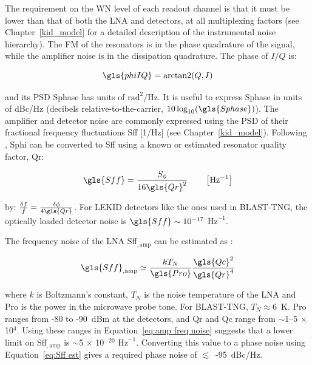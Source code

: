 The requirement on the WN level of each readout channel is that it must be lower than that of both the LNA and detectors, at all multiplexing factors (see Chapter~\ref{kid_model} for a detailed description of the instrumental noise hierarchy). The FM of the resonators is in the phase quadrature of the signal, while the amplifier noise is in the dissipation quadrature. The phase of $I/Q$ is:

\begin{equation}
  \gls{phiIQ} = \arctantwo(Q,I)
\end{equation}

and its PSD \gls{Sphase} has units of $\mathrm{rad}^{2}/\mathrm{Hz}$. It is useful to express \gls{Sphase} in units of dBc/Hz (decibels relative-to-the-carrier, $10\log_{10}(\gls{Sphase})$). The amplifier and detector noise are commonly expressed using the PSD of their fractional frequency fluctuations \gls{Sff} [1/Hz] (see Chapter~\ref{kid_model}). Following \citet{gao2008physics}, \gls{Sphi} can be converted to \gls{Sff} using a known or estimated resonator quality factor, \gls{Qr}:

\begin{equation}\label{eq:Sff est}
  \gls{Sff} = \frac{S_{\phi}}{16 \gls{Qr}^{2}} \qquad \left[ \mathrm{Hz}^{-1} \right]
\end{equation}

by: $\frac{\delta f}{f} = \frac{\delta \phi}{4 \gls{Qr}}$. For LEKID detectors like the ones used in BLAST-TNG, the optically loaded detector noise is $\gls{Sff} \sim 10^{-17}$ $\mathrm{Hz}^{-1}$.

The frequency noise of the LNA \gls{Sff}$_{,\mathrm{amp}}$ can be estimated as \citep{barry2014development}:

\begin{equation}\label{eq:amp freq noise}
  \gls{Sff}_{,\mathrm{amp}} \simeq \frac{kT_{N}}{\gls{Pro}}\frac{\gls{Qc}^{2}}{\gls{Qr}^{4}}
\end{equation}

where $k$ is Boltzmann's constant, $T_{N}$ is the noise temperature of the LNA and \gls{Pro} is the power in the microwave probe tone. For BLAST-TNG, $T_{N} \approx 6$~K. \gls{Pro} ranges from -80 to -90~dBm at the detectors, and \gls{Qr} and \gls{Qc} range from $\sim$1--5 $\times$ 10$^{4}$. Using these ranges in Equation~\ref{eq:amp freq noise} suggests that a lower limit on \gls{Sff}$_{,\mathrm{amp}}$ is $\sim$5 $\times$ 10$^{-20}$ $\mathrm{Hz}^{-1}$. Converting this value to a phase noise using Equation~\ref{eq:Sff est} gives a required phase noise of $\lesssim$~-95~dBc/Hz.


